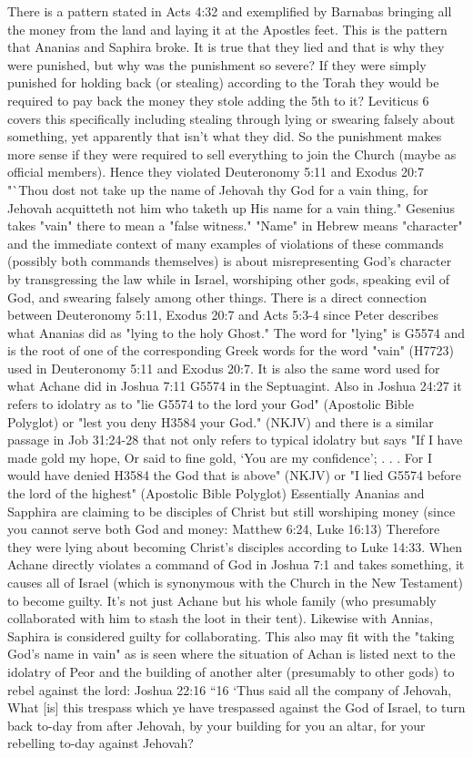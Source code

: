 \documentclass[11pt]{article}
\begin{document}
There is a pattern stated in Acts 4:32 and exemplified by Barnabas bringing all the money from the land and laying it at the Apostles feet. This is the pattern that Ananias and Saphira broke. It is true that they lied and that is why they were punished, but why was the punishment so severe? If they were simply punished for holding back (or stealing) according to the Torah they would be required to pay back the money they stole adding the 5th to it? Leviticus 6 covers this specifically including stealing through lying or swearing falsely about something, yet apparently that isn't what they did. So the punishment makes more sense if they were required to sell everything to join the Church (maybe as official members). Hence they violated Deuteronomy 5:11 and Exodus 20:7 "`Thou dost not take up the name of Jehovah thy God for a vain thing, for Jehovah acquitteth not him who taketh up His name for a vain thing."
Gesenius takes "vain" there to mean a "false witness." "Name" in Hebrew means "character" \cite{name means character} and the immediate context of many examples of violations of these commands (possibly both commands themselves) is about misrepresenting God's character by transgressing the law while in Israel, worshiping other gods, speaking evil of God, and swearing falsely among other things. There is a direct connection between Deuteronomy 5:11, Exodus 20:7 and Acts 5:3-4 since Peter describes what Ananias did as "lying to the holy Ghost." The word for "lying" is G5574 and is the root of one of the corresponding Greek words for the word "vain" (H7723) used in Deuteronomy 5:11 and Exodus 20:7. It is also the same word used for what Achane did in Joshua 7:11 G5574 in the Septuagint. Also in Joshua 24:27 it refers to idolatry as to "lie G5574 to the lord your God" (Apostolic Bible Polyglot) or "lest you deny H3584 your God." (NKJV) and there is a similar passage in Job 31:24-28 that not only refers to typical idolatry but says "If I have made gold my hope, Or said to fine gold, ‘You are my confidence’;  . . . For I would have denied H3584 the God that is above" (NKJV) or "I lied G5574 before the lord of the highest" (Apostolic Bible Polyglot) \cite{in vain} Essentially Ananias and Sapphira are claiming to be disciples of Christ but still worshiping money (since you cannot serve both God and money: Matthew 6:24, Luke 16:13) Therefore they were lying about becoming Christ's disciples according to Luke 14:33. When Achane directly violates a command of God in Joshua 7:1 and takes something, it causes all of Israel (which is synonymous with the Church in the New Testament) to become guilty. It's not just Achane but his whole family (who presumably collaborated with him to stash the loot in their tent). Likewise with Annias, Saphira is considered guilty for collaborating. This also may fit with the "taking God's name in vain" as is seen where the situation of Achan is listed next to the idolatry of Peor and the building of another alter (presumably to other gods) to rebel  against the lord:
Joshua 22:16 “16 `Thus said all the company of Jehovah, What [is] this trespass which ye have trespassed against the God of Israel, to turn back to-day from after Jehovah, by your building for you an altar, for your rebelling to-day against Jehovah?
\end{document}
